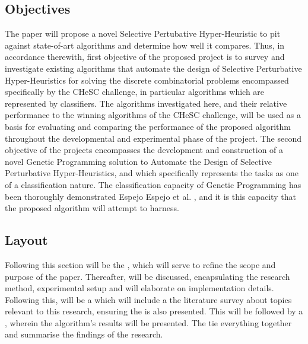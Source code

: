 \documentclass[a4paper,12pt]{article}
\begin{document}
    \subsection{Objectives}
        \par{ 
            \noindent 
            The paper will propose a novel Selective Pertubative Hyper-Heuristic to pit against
            state-of-art algorithms and determine how well it compares. Thus, in accordance therewith, first 
            objective of the proposed project is to survey and investigate existing
            algorithms that automate the design of Selective Perturbative Hyper-Heuristics
            for solving the discrete combinatorial problems encompassed specifically by the
            CHeSC challenge, in particular algorithms which are represented by classifiers.
            The algorithms investigated here, and their relative performance to the winning
            algorithms of the CHeSC challenge, will be used as a basis for evaluating and
            comparing the performance of the proposed algorithm throughout the developmental 
            and experimental phase of the project.\newline 
            \newline 
            The second objective of the projects encompasses the development and construction of a novel 
            Genetic Programming solution to Automate the Design of Selective Perturbative Hyper-Heuristics, 
            and which specifically represents the tasks as one of a classification nature. The classification 
            capacity of Genetic Programming has been thoroughly demonstrated Espejo Espejo et al. \cite{sgpc}, and it
            is this capacity that the proposed algorithm will attempt to harness.
        }
    \subsection{Layout}
        \par{
            \noindent
            Following this section will be the , which will serve to refine the scope and purpose of the paper.
            Thereafter,   will be discussed, encapsulating the research method, experimental setup and 
            will elaborate on implementation details. Following this, will be a  which will include a the 
            literature survey about topics relevant to this research, ensuring the  is also presented. This will 
            be followed by a , wherein the algorithm's results will be presented. The 
            tie everything together and summarise the findings of the research.
        }
\end{document}
